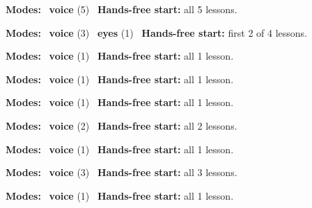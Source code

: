 \expandafter\def\csname hlchaptermodality69\endcsname{%
  {\small\noindent
    \textbf{Modes:} \hlvoicesign{}~\textbf{voice} (5)\quad
    \hlvoicesign{}~\textbf{Hands-free start:} all 5 lessons.%
    \par}\medskip
}

\expandafter\def\csname hlchaptermodality70\endcsname{%
  {\small\noindent
    \textbf{Modes:} \hlvoicesign{}~\textbf{voice} (3) \quad \hlsightsign{}~\textbf{eyes} (1)\quad
    \hlvoicesign{}~\textbf{Hands-free start:} first 2 of 4 lessons.%
    \par}\medskip
}

\expandafter\def\csname hlchaptermodality71\endcsname{%
  {\small\noindent
    \textbf{Modes:} \hlvoicesign{}~\textbf{voice} (1)\quad
    \hlvoicesign{}~\textbf{Hands-free start:} all 1 lesson.%
    \par}\medskip
}

\expandafter\def\csname hlchaptermodality72\endcsname{%
  {\small\noindent
    \textbf{Modes:} \hlvoicesign{}~\textbf{voice} (1)\quad
    \hlvoicesign{}~\textbf{Hands-free start:} all 1 lesson.%
    \par}\medskip
}

\expandafter\def\csname hlchaptermodality73\endcsname{%
  {\small\noindent
    \textbf{Modes:} \hlvoicesign{}~\textbf{voice} (1)\quad
    \hlvoicesign{}~\textbf{Hands-free start:} all 1 lesson.%
    \par}\medskip
}

\expandafter\def\csname hlchaptermodality74\endcsname{%
  {\small\noindent
    \textbf{Modes:} \hlvoicesign{}~\textbf{voice} (2)\quad
    \hlvoicesign{}~\textbf{Hands-free start:} all 2 lessons.%
    \par}\medskip
}

\expandafter\def\csname hlchaptermodality75\endcsname{%
  {\small\noindent
    \textbf{Modes:} \hlvoicesign{}~\textbf{voice} (1)\quad
    \hlvoicesign{}~\textbf{Hands-free start:} all 1 lesson.%
    \par}\medskip
}

\expandafter\def\csname hlchaptermodality76\endcsname{%
  {\small\noindent
    \textbf{Modes:} \hlvoicesign{}~\textbf{voice} (3)\quad
    \hlvoicesign{}~\textbf{Hands-free start:} all 3 lessons.%
    \par}\medskip
}

\expandafter\def\csname hlchaptermodality77\endcsname{%
  {\small\noindent
    \textbf{Modes:} \hlvoicesign{}~\textbf{voice} (1)\quad
    \hlvoicesign{}~\textbf{Hands-free start:} all 1 lesson.%
    \par}\medskip
}

